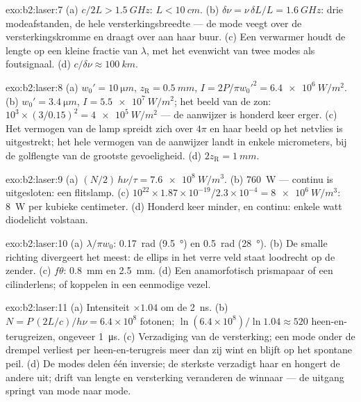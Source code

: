 \begin{solution}{exo:b2:laser:7}
(a) $c/2L > \qty{1.5}{GHz}$: $L < \qty{10}{cm}$. (b)
$\delta\nu = \nu\,\delta L/L
= \qty{1.6}{GHz}$: drie modeafstanden, de hele
versterkingsbreedte --- de mode
veegt over de versterkingskromme en draagt over aan haar buur. (c) Een
verwarmer houdt de lengte op een kleine fractie van $\lambda$, met het
evenwicht van twee modes als foutsignaal. (d) $c/\delta\nu \approx
\qty{100}{km}$.
\end{solution}

\begin{solution}{exo:b2:laser:8}
(a) $w_0' = \qty{10}{\micro m}$, $z_{\text{R}} = \qty{0.5}{mm}$,
$I = 2P/\pi
w_0'^2 = \qty{6.4e6}{W/m^2}$. (b) $w_0' = \qty{3.4}{\micro m}$,
$I =
\qty{5.5e7}{W/m^2}$; het beeld van de zon:
$10^3 \times (3/0.15)^2 =
\qty{4e5}{W/m^2}$ --- de aanwijzer is honderd keer
erger. (c) Het vermogen van de lamp
spreidt zich over $4\pi$ en haar beeld op het netvlies is uitgestrekt; het
hele vermogen van de aanwijzer landt in enkele micrometers, bij de golflengte
van de grootste gevoeligheid. (d) $2z_{\text{R}} = \qty{1}{mm}$.
\end{solution}

\begin{solution}{exo:b2:laser:9}
(a) $(N/2)\,h\nu/\tau = \qty{7.6e8}{W/m^3}$. (b) \qty{760}{W} --- continu
is uitgesloten: een flitslamp. (c)
$10^{22} \times 1.87 \times
10^{-19}/2.3 \times 10^{-4} = \qty{8e6}{W/m^3}$:
\qty{8}{W} per kubieke
centimeter. (d) Honderd keer minder, en continu: enkele watt
diodelicht volstaan.
\end{solution}

\begin{solution}{exo:b2:laser:10}
(a) $\lambda/\pi w_0$: \qty{0.17}{rad} (\qty{9.5}{\degree}) en \qty{0.5}{rad}
(\qty{28}{\degree}). (b) De smalle richting divergeert het meest: de
ellips in het verre veld staat loodrecht op de zender. (c) $f\theta$:
\qty{0.8}{mm} en \qty{2.5}{mm}. (d) Een anamorfotisch prismapaar of een
cilinderlens; of koppelen in een eenmodige vezel.
\end{solution}

\begin{solution}{exo:b2:laser:11}
(a) Intensiteit $\times 1.04$ om de \qty{2}{ns}. (b)
$N = P\,(2L/c)/h\nu =
6.4 \times 10^8$ fotonen;
$\ln(6.4 \times 10^8)/\ln 1.04 \approx 520$
heen-en-terugreizen, ongeveer \qty{1}{\micro s}. (c) Verzadiging van de
versterking; een mode onder
de drempel verliest per heen-en-terugreis meer dan zij wint en blijft op het
spontane peil. (d) De modes delen één inversie; de sterkste
verzadigt haar en hongert de andere uit; drift van lengte en versterking veranderen
de winnaar --- de uitgang springt van mode naar mode.
\end{solution}

